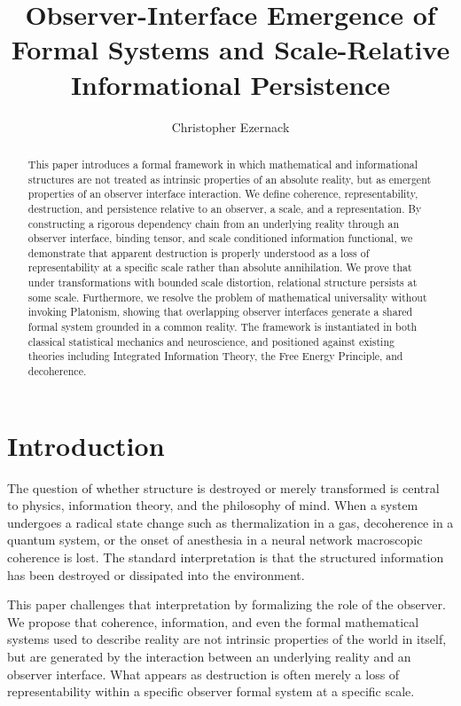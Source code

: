 \documentclass[12pt]{article}
\title{Observer-Interface Emergence of Formal Systems and Scale-Relative Informational Persistence}
\author{Christopher Ezernack}
\date{}
\theoremstyle{definition}
\begin{document}
\maketitle

\begin{abstract}
This paper introduces a formal framework in which mathematical and informational structures are not treated as intrinsic properties of an absolute reality, but as emergent properties of an observer interface interaction. We define coherence, representability, destruction, and persistence relative to an observer, a scale, and a representation. By constructing a rigorous dependency chain from an underlying reality through an observer interface, binding tensor, and scale conditioned information functional, we demonstrate that apparent destruction is properly understood as a loss of representability at a specific scale rather than absolute annihilation. We prove that under transformations with bounded scale distortion, relational structure persists at some scale. Furthermore, we resolve the problem of mathematical universality without invoking Platonism, showing that overlapping observer interfaces generate a shared formal system grounded in a common reality. The framework is instantiated in both classical statistical mechanics and neuroscience, and positioned against existing theories including Integrated Information Theory, the Free Energy Principle, and decoherence.
\end{abstract}

\section{Introduction}

The question of whether structure is destroyed or merely transformed is central to physics, information theory, and the philosophy of mind. When a system undergoes a radical state change such as thermalization in a gas, decoherence in a quantum system, or the onset of anesthesia in a neural network macroscopic coherence is lost. The standard interpretation is that the structured information has been destroyed or dissipated into the environment. 

This paper challenges that interpretation by formalizing the role of the observer. We propose that coherence, information, and even the formal mathematical systems used to describe reality are not intrinsic properties of the world in itself, but are generated by the interaction between an underlying reality and an observer interface. What appears as destruction is often merely a loss of representability within a specific observer formal system at a specific scale.
\end{document}
